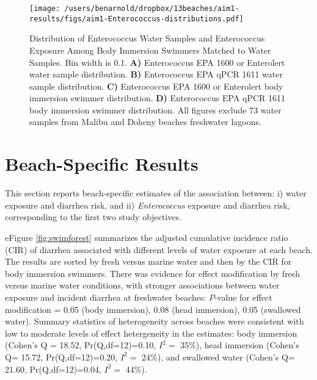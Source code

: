 \documentclass[12pt]{article}\usepackage[]{graphicx}\usepackage[]{color}
\begin{document}
\begin{figure}
\begin{center}
\texttt{[image: /users/benarnold/dropbox/13beaches/aim1-results/figs/aim1-Enterococcus-distributions.pdf]}
\caption{Distribution of Enterococcus Water Samples and Enterococcus Exposure Among Body Immersion Swimmers Matched to Water Samples. Bin width is 0.1.  \textbf{A)} Enterococcus EPA 1600 or Enterolert water sample distribution. \textbf{B)} Enterococcus EPA qPCR 1611 water sample distribution. \textbf{C)} Enterococcus EPA 1600 or Enterolert body immersion swimmer distribution. \textbf{D)} Enterococcus EPA qPCR 1611 body immersion swimmer distribution.  All figures exclude 73 water samples from Malibu and Doheny beaches freshwater lagoons.
\label{fig:enterodist}}
\end{center}
\end{figure}



\clearpage
\section{Beach-Specific Results}



This section reports beach-specific estimates of the association between: i) water exposure and diarrhea risk, and ii) \emph{Enterococcus} exposure and diarrhea risk, corresponding to the first two study objectives.

eFigure \ref{fig:swimforest} summarizes the adjusted cumulative incidence ratio (CIR) of diarrhea associated with different levels of water exposure at each beach.  The results are sorted by fresh versus marine water and then by the CIR for body immersion swimmers. There was evidence for effect modification by fresh versus marine water conditions, with stronger associations between water exposure and incident diarrhea at freshwater beaches: $P$-value for effect modification = 0.05 (body immersion), 0.08 (head immersion), 0.05 (swallowed water). Summary statistics of heterogeneity across beaches\supercite{Higgins2002-vr, Higgins2003-bh} were consistent with low to moderate levels of effect hetergeneity in the estimates: body immersion (Cohen's Q =
18.52, 
Pr(Q,df=12)=0.10,
$I^2=$ 35\%),
 head immersion (Cohen's Q=
 15.72, 
Pr(Q,df=12)=0.20,
$I^2=$ 24\%),
 and swallowed water (Cohen's Q=
 21.60, 
Pr(Q,df=12)=0.04,
$I^2=$ 44\%).
\end{document}
